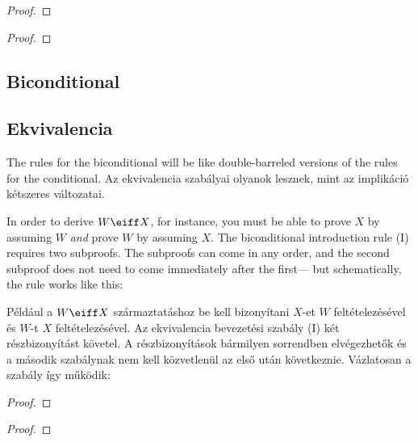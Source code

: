 \label{HSproof}
\begin{proof}
	\open
	\close
\end{proof}

\label{HSproof}
\begin{proof}
	\open
	\close
\end{proof}



\subsection*{Biconditional}
\subsection{Ekvivalencia}
The rules for the biconditional will be like double-barreled versions of the rules for the conditional.
Az ekvivalencia szabályai olyanok lesznek, mint az implikáció kétszeres változatai.

In order to derive $W \eiff X$, for instance, you must be able to prove $X$ by assuming $W$ \emph{and} prove $W$ by assuming $X$. The biconditional introduction rule ({\eiff}I) requires two subproofs. The subproofs can come in any order, and the second subproof does not need to come immediately after the first--- but schematically, the rule works like this:

Például a $W \eiff X$ származtatáshoz be kell bizonyítani $X$-et $W$ feltételezésével és $W$-t $X$ feltételezésével. Az ekvivalencia bevezetési szabály ({\eiff}I) két részbizonyítást követel. A részbizonyítások bármilyen sorrendben elvégezhetők és a második szabálynak nem kell közvetlenül az első után következnie. Vázlatosan a szabály így működik:

\begin{proof}
	\open
		 
	\close
	\open
		 
	\close
\end{proof}

\begin{proof}
	\open
		 
	\close
	\open
		 
	\close
\end{proof}

